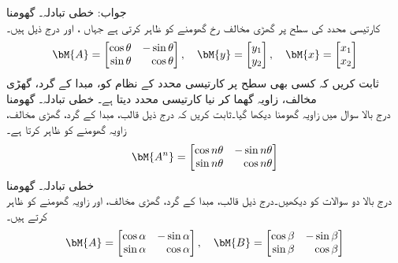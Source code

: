 جواب: 
\quad خطی تبادلہ۔ گھومنا\\
کارتیسی محدد کی  سطح پر گھڑی  مخالف  رخ گھومنے کو  ظاہر کرتی ہے جہاں ،  اور  درج ذیل ہیں۔
\begin{align*}
\bM{A}=\begin{bmatrix*}[r] \cos \theta&-\sin \theta\\ \sin \theta & \cos \theta \end{bmatrix*}, \quad \bM{y}=\begin{bmatrix} y_1\\ y_2 \end{bmatrix},\quad \bM{x}=\begin{bmatrix}x_1 \\ x_2  \end{bmatrix}
\end{align*}
ثابت کریں کہ  کسی بھی سطح پر  کارتیسی محدد کے نظام کو، مبدا کے گرد،  گھڑی مخالف،   زاویہ گھما کر نیا کارتیسی محدد  دیتا ہے۔
\quad خطی تبادلہ۔ گھومنا\\
درج بالا سوال میں  زاویہ گھومنا دیکھا گیا۔ثابت کریں کہ درج ذیل قالب، مبدا کے گرد، گھڑی مخالف،   زاویہ گھومنے کو ظاہر کرتا ہے۔ 
\begin{align*}
\bM{A^n}=\begin{bmatrix*}[r] \cos n\theta&-\sin n\theta\\ \sin n\theta & \cos n\theta \end{bmatrix*}
\end{align*}
\quad خطی تبادلہ۔ گھومنا\\
درج بالا دو سوالات کو دیکھیں۔درج ذیل قالب، مبدا کے گرد، گھڑی مخالف،  اور  زاویہ گھومنے کو ظاہر کرتے ہیں۔
\begin{align*}
\bM{A}=\begin{bmatrix*}[r] \cos \alpha&-\sin \alpha\\ \sin \alpha & \cos \alpha \end{bmatrix*}, \quad \bM{B}=\begin{bmatrix*}[r] \cos \beta&-\sin \beta\\ \sin \beta & \cos \beta \end{bmatrix*}
\end{align*}
